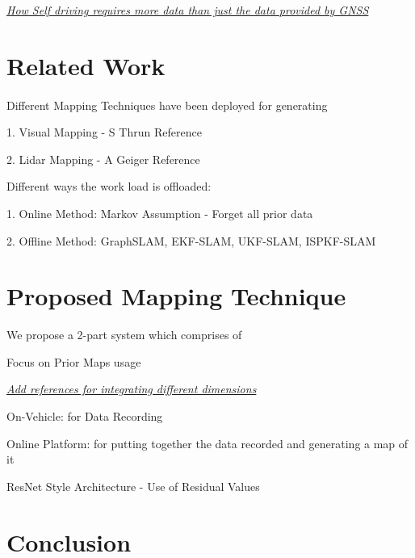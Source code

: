 \documentclass{article}
\begin{document}
	\underline{\textit{How Self driving requires more data than just the data provided by GNSS}}
	
	\section{Related Work}
	\paragraph{}
	Different Mapping Techniques have been deployed for generating
	
	1. Visual Mapping - S Thrun Reference \cite{Levinson_Montemerlo_Thrun_2007}
	
	2. Lidar Mapping - A Geiger Reference 
	
	Different ways the work load is offloaded:
	
	1. Online Method: Markov Assumption - Forget all prior data
	
	2. Offline Method: GraphSLAM, EKF-SLAM, UKF-SLAM, ISPKF-SLAM
	
	\section{Proposed Mapping Technique}
	
	We propose a 2-part system which comprises of
	
	Focus on Prior Maps usage
	
	\underline{\textit{Add references for integrating different dimensions}}
	
	On-Vehicle: for Data Recording
	
	Online Platform: for putting together the data recorded and generating a map of it
	
	ResNet Style Architecture - Use of Residual Values 
	
	\section{Conclusion}
	
	
	


\end{document}
